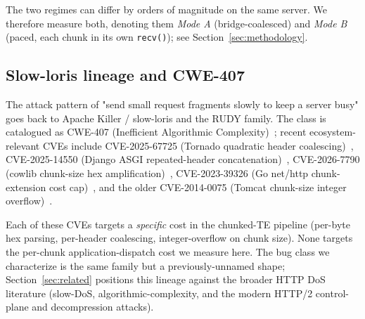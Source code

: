 The two regimes can differ by orders of magnitude on the same
server. We therefore measure both, denoting them \emph{Mode A}
(bridge-coalesced) and \emph{Mode B} (paced, each chunk in its
own \texttt{recv()}); see Section~\ref{sec:methodology}.

\subsection{Slow-loris lineage and CWE-407}
\label{sec:bg-cwe}

The attack pattern of "send small request fragments slowly to keep
a server busy" goes back to Apache Killer / slow-loris and the RUDY
family. The class is catalogued as CWE-407 (Inefficient Algorithmic
Complexity)~\cite{cwe407}; recent ecosystem-relevant CVEs include
CVE-2025-67725 (Tornado quadratic header
coalescing)~\cite{cve_2025_67725_tornado}, CVE-2025-14550
(Django ASGI repeated-header concatenation)~\cite{cve_2025_14550_django},
CVE-2026-7790 (cowlib chunk-size hex
amplification)~\cite{cve_2026_7790_cowlib}, CVE-2023-39326 (Go
net/http chunk-extension cost cap)~\cite{cve_2023_39326_go}, and
the older CVE-2014-0075 (Tomcat chunk-size integer
overflow)~\cite{cve_2014_0075_tomcat}.

Each of these CVEs targets a \emph{specific} cost in the
chunked-TE pipeline (per-byte hex parsing, per-header coalescing,
integer-overflow on chunk size). None targets the per-chunk
application-dispatch cost we measure here. The bug class we
characterize is the same family but a previously-unnamed shape;
Section~\ref{sec:related} positions this lineage against the
broader HTTP DoS literature (slow-DoS, algorithmic-complexity, and
the modern HTTP/2 control-plane and decompression attacks).
